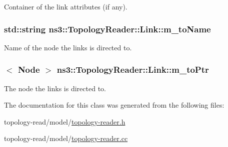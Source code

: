 Container of the link attributes (if any). 

\subsubsection[{\texorpdfstring{m\+\_\+to\+Name}{m_toName}}]{\setlength{\rightskip}{0pt plus 5cm}std\+::string ns3\+::\+Topology\+Reader\+::\+Link\+::m\+\_\+to\+Name\hspace{0.3cm}{\ttfamily [private]}}\hypertarget{classns3_1_1TopologyReader_1_1Link_aa2bdf5d42515ef48cfe10d1ff84c3017}{}\label{classns3_1_1TopologyReader_1_1Link_aa2bdf5d42515ef48cfe10d1ff84c3017}


Name of the node the links is directed to. 

\subsubsection[{\texorpdfstring{m\+\_\+to\+Ptr}{m_toPtr}}]{$<$ {\bf Node} $>$ ns3\+::\+Topology\+Reader\+::\+Link\+::m\+\_\+to\+Ptr\hspace{0.3cm}{\ttfamily [private]}}\hypertarget{classns3_1_1TopologyReader_1_1Link_aaa958216fb5b999439b477dd03608b2a}{}\label{classns3_1_1TopologyReader_1_1Link_aaa958216fb5b999439b477dd03608b2a}


The node the links is directed to. 



The documentation for this class was generated from the following files\+:\begin{DoxyCompactItemize}
\item 
topology-\/read/model/\hyperlink{topology-reader_8h}{topology-\/reader.\+h}\item 
topology-\/read/model/\hyperlink{topology-reader_8cc}{topology-\/reader.\+cc}\end{DoxyCompactItemize}
